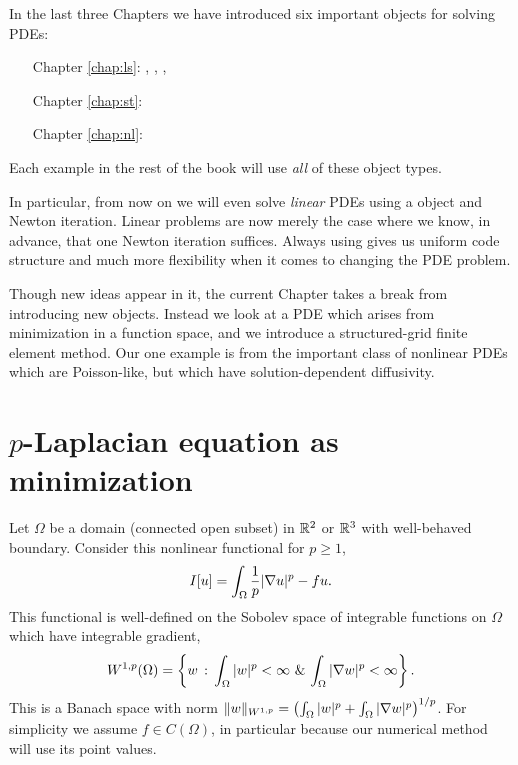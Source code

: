 
In the last three Chapters we have introduced six important \PETSc objects for solving PDEs:
\begin{itemize}
\item[\quad Chapter \ref{chap:ls}:] \pVec, \pMat, \pKSP, \pPC
\item[\quad Chapter \ref{chap:st}:] \pDM{}
\item[\quad Chapter \ref{chap:nl}:] \pSNES
\end{itemize}
Each example in the rest of the book will use \emph{all} of these object types.

In particular, from now on we will even solve \emph{linear} PDEs using a \pSNES object and Newton iteration.  Linear problems are now merely the case where we know, in advance, that one Newton iteration suffices.  Always using \pSNES gives us uniform code structure and much more flexibility when it comes to changing the PDE problem.

Though new ideas appear in it, the current Chapter takes a break from introducing new \PETSc objects.  Instead we look at a PDE which arises from minimization in a function space, and we introduce a structured-grid finite element method.  Our one example is from the important class of nonlinear PDEs which are Poisson-like, but which have solution-dependent diffusivity.


\section{$p$-Laplacian equation as minimization}

Let $\Omega$ be a domain (connected open subset) in $\mathbb{R}^2$ or $\mathbb{R}^3$ with well-behaved boundary.  Consider this nonlinear functional for $p \ge 1$,
\begin{equation}
    I[u] = \int_\Omega \frac{1}{p} |\nabla u|^p - fu.  \label{eq:of:functional}
\end{equation}
This functional is well-defined on the Sobolev space \citep{AdamsFournier2003,Evans2010} of integrable functions on $\Omega$ which have integrable gradient,
\begin{equation}
    W^{1,p}(\Omega) = \left\{w \,:\, \int_\Omega |w|^p < \infty \,\, \& \, \int_\Omega |\nabla w|^p < \infty\right\}. \label{eq:of:sobolevdefn}
\end{equation}
This is a Banach space with norm $\|w\|_{W^{1,p}} = \left(\int_\Omega |w|^p + \int_\Omega |\nabla w|^p\right)^{1/p}$.  For simplicity we assume $f\in C(\Omega)$, in particular because our numerical method will use its point values.

